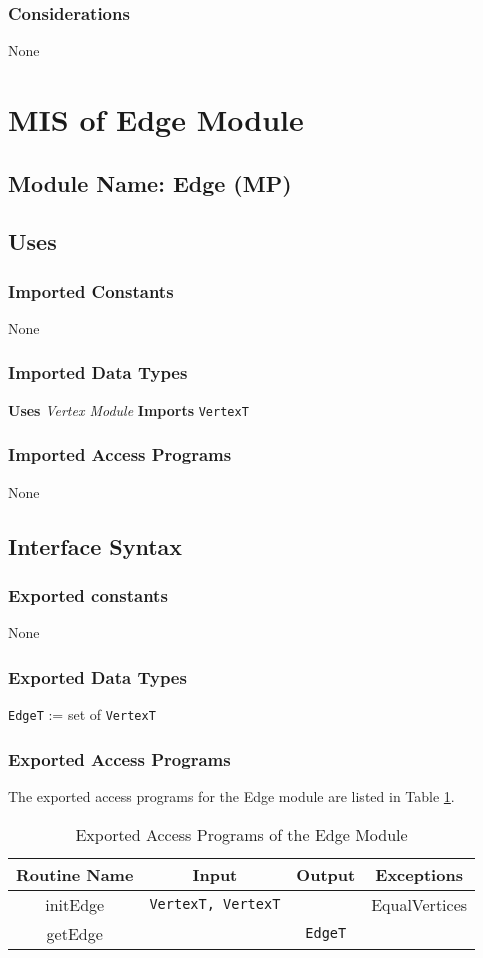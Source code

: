 \documentclass[12pt,titlepage]{article}
\begin{document}
\subsubsection{Considerations} None


\section{MIS of Edge Module \label{AmisSecE}}

\subsection{Module Name: Edge (MP)}

\subsection{Uses}
\subsubsection{Imported Constants} None
\subsubsection{Imported Data Types} 
{\bf Uses}  \emph{Vertex Module}  {\bf Imports}  \texttt{VertexT}  
\subsubsection{Imported Access Programs}None

\subsection{Interface Syntax}
\subsubsection{Exported constants} None
\subsubsection{Exported Data Types}
{\tt EdgeT} := set of {\tt VertexT}
\subsubsection{Exported Access Programs}
The exported access programs for the Edge module are listed in Table \ref{AmisEEAP}.
\begin{table}[htbp]
\centering
\begin{tabular}{|c|c|c|c|}
\hline
Routine Name & Input & Output & Exceptions \\ 
\hline
initEdge & {\tt VertexT, VertexT}& & EqualVertices\\
\hline
getEdge &  & {\tt EdgeT} & \\
\hline
\end{tabular}
\caption{Exported Access Programs of the Edge Module}
\label{AmisEEAP} 
\end{table}
\end{document}
